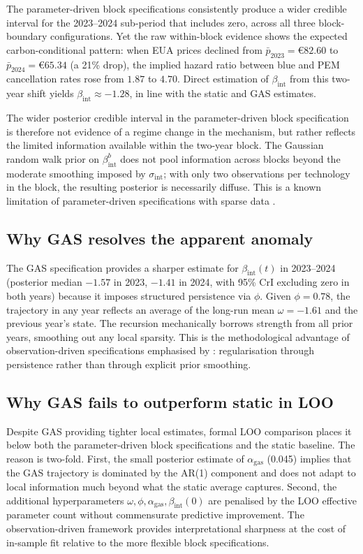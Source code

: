 \documentclass[11pt,a4paper]{article}
\newcommand{\bint}{\beta_{\mathrm{int}}}
\begin{document}
The parameter-driven block specifications consistently produce a wider credible interval for the 2023--2024 sub-period that includes zero, across all three block-boundary configurations. Yet the raw within-block evidence shows the expected carbon-conditional pattern: when EUA prices declined from $\bar{p}_{2023} = $\euro$82.60$ to $\bar{p}_{2024} = $\euro$65.34$ (a 21\% drop), the implied hazard ratio between blue and PEM cancellation rates rose from $1.87$ to $4.70$. Direct estimation of $\bint$ from this two-year shift yields $\bint \approx -1.28$, in line with the static and GAS estimates.

The wider posterior credible interval in the parameter-driven block specification is therefore not evidence of a regime change in the mechanism, but rather reflects the limited information available within the two-year block. The Gaussian random walk prior on $\bint^{b}$ does not pool information across blocks beyond the moderate smoothing imposed by $\sigma_{\mathrm{int}}$; with only two observations per technology in the block, the resulting posterior is necessarily diffuse. This is a known limitation of parameter-driven specifications with sparse data \citep[][Chapter 11]{durbin2012time}.

\subsection{Why GAS resolves the apparent anomaly}

The GAS specification provides a sharper estimate for $\bint(t)$ in 2023--2024 (posterior median $-1.57$ in 2023, $-1.41$ in 2024, with 95\% CrI excluding zero in both years) because it imposes structured persistence via $\phi$. Given $\phi = 0.78$, the trajectory in any year reflects an average of the long-run mean $\omega = -1.61$ and the previous year's state. The recursion mechanically borrows strength from all prior years, smoothing out any local sparsity. This is the methodological advantage of observation-driven specifications emphasised by \citet{koopman2016predicting}: regularisation through persistence rather than through explicit prior smoothing.

\subsection{Why GAS fails to outperform static in LOO}

Despite GAS providing tighter local estimates, formal LOO comparison places it below both the parameter-driven block specifications and the static baseline. The reason is two-fold. First, the small posterior estimate of $\alpha_{\mathrm{gas}}$ (0.045) implies that the GAS trajectory is dominated by the AR(1) component and does not adapt to local information much beyond what the static average captures. Second, the additional hyperparameters $\omega, \phi, \alpha_{\mathrm{gas}}, \bint(0)$ are penalised by the LOO effective parameter count without commensurate predictive improvement. The observation-driven framework provides interpretational sharpness at the cost of in-sample fit relative to the more flexible block specifications.
\end{document}
